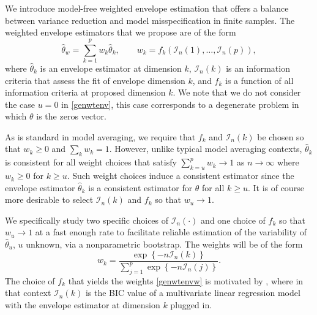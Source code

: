 \documentclass{article}\usepackage[]{graphicx}\usepackage[]{color}
\newcommand{\In}{\mathcal{I}_n}
\begin{document}
We introduce model-free weighted envelope estimation that offers a balance between variance reduction and model misspecification in finite samples. %
The weighted envelope estimators that we propose are of the form
\begin{equation} \label{genwtenv}
  \hat{\theta}_w = \sum_{k=1}^p w_k\hat{\theta}_k, 
    \qquad w_k = f_k(\In(1),\ldots, \In(p)),
\end{equation}
where $\hat{\theta}_k$ is an envelope estimator at dimension $k$, $\In(k)$ is an information criteria that assess the fit of envelope dimension $k$, and $f_k$ is a function of all information criteria at proposed dimension $k$. We note that we do not consider the case $u = 0$ in \eqref{genwtenv}, this case corresponds to a degenerate problem in which $\theta$ is the zeros vector.

As is standard in model averaging, we require that $f_k$ and $\In(k)$ be chosen so that $w_k \geq 0$ and $\sum_k w_k = 1$. However, unlike typical model averaging contexts, $\hat{\theta}_k$ is consistent for all weight choices that satisfy $\sum_{k=u}^p w_k \to 1$ as $n \to \infty$ where $w_k \geq 0$ for $k \geq u$. Such weight choices induce a consistent estimator since the envelope estimator $\hat{\theta}_k$ is a consistent estimator for $\theta$ for all $k \geq u$. It is of course more desirable to select $\In(k)$ and $f_k$ so that $w_u \to 1$.

We specifically study two specific choices of $\In(\cdot)$ and one choice of $f_k$ so that $w_u \to 1$ 
at a fast enough rate to facilitate reliable estimation of the variability of $\hat{\theta}_u$, 
$u$ unknown, via a nonparametric bootstrap. The weights will be of the form 
\begin{equation} \label{genwtenvw}
  w_k = \frac{\exp\left\{-n\In(k)\right\}}
    {\sum_{j=1}^p\exp\left\{-n\In(j)\right\}}.
\end{equation}
The choice of $f_k$ that yields the weights \eqref{genwtenvw} is motivated by \cite{eck2017weighted}, where in that context $\In(k)$ is the \textsc{BIC} value of a multivariate linear regression model with the envelope estimator at dimension $k$ plugged in. 
\end{document}
